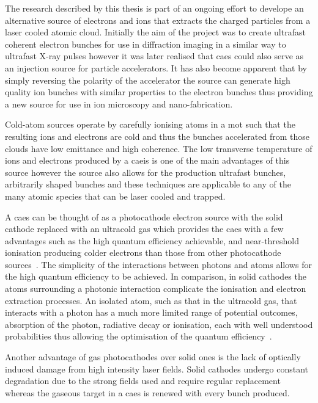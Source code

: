 The research described by this thesis is part of an ongoing effort to develope an alternative source of electrons and ions that extracts the charged particles from a laser cooled atomic cloud.
Initially the aim of the project was to create ultrafast coherent electron bunches for use in diffraction imaging in a similar way to ultrafast X-ray pulses however it was later realised that \gls{caes} could also serve as an injection source for particle accelerators.
It has also become apparent that by simply reversing the polarity of the accelerator the source can generate high quality ion bunches with similar properties to the electron bunches thus providing a new source for use in ion microscopy and nano-fabrication.

Cold-atom sources operate by carefully ionising atoms in a \gls{mot} such that the resulting ions and electrons are cold and thus the bunches accelerated from those clouds have low emittance and high coherence.
The low transverse temperature of ions and electrons produced by a \gls{caeis} is one of the main advantages of this source however the source also allows for the production ultrafast bunches, arbitrarily shaped bunches and these techniques are applicable to any of the many atomic species that can be laser cooled and trapped.

A \gls{caes} can be thought of as a photocathode electron source with the solid cathode replaced with an ultracold gas which provides the \gls{caes} with a few advantages such as the high quantum efficiency achievable, and near-threshold ionisation producing colder electrons than those from other photocathode sources~\cite{engelen_effective_2014}.
The simplicity of the interactions between photons and atoms allows for the high quantum efficiency to be achieved.
In comparison, in solid cathodes the atoms surrounding a photonic interaction complicate the ionisation and electron extraction processes.
An isolated atom, such as that in the ultracold gas, that interacts with a photon has a much more limited range of potential outcomes, absorption of the photon, radiative decay or ionisation, each with well understood probabilities thus allowing the optimisation of the quantum efficiency~\cite{baranov_field_1994}.

Another advantage of gas photocathodes over solid ones is the lack of optically induced damage from high intensity laser fields.
Solid cathodes undergo constant degradation due to the strong fields used and require regular replacement~\cite{dowell_results_1995} whereas the gaseous target in a \gls{caes} is renewed with every bunch produced.


